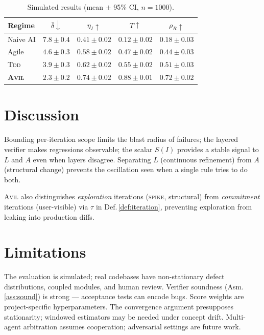\documentclass[10pt,twocolumn,letterpaper]{article}
\theoremstyle{definition}
\theoremstyle{plain}
\newcommand{\AVIL}{\textsc{Avil}}
\newcommand{\TDD}{\textsc{Tdd}}
\begin{document}
\begin{table}[t]
\centering
\caption{Simulated results (mean $\pm$ 95\% CI, $n{=}1000$).}
\label{tab:sim}
\setlength{\tabcolsep}{4pt}
\renewcommand{\arraystretch}{1.1}
\small
\begin{tabular}{@{}lcccc@{}}
\toprule
\textbf{Regime} & $\bar\delta\!\downarrow$ & $\eta_I\!\uparrow$
                & $T\!\uparrow$ & $\rho_R\!\uparrow$ \\
\midrule
Naive AI   & $7.8\pm0.4$ & $0.41\pm0.02$ & $0.12\pm0.02$ & $0.18\pm0.03$ \\
Agile      & $4.6\pm0.3$ & $0.58\pm0.02$ & $0.47\pm0.02$ & $0.44\pm0.03$ \\
\TDD{}     & $3.9\pm0.3$ & $0.62\pm0.02$ & $0.55\pm0.02$ & $0.51\pm0.03$ \\
\rowcolor{arxlight}
\textbf{\AVIL{}} & $\mathbf{2.3\pm0.2}$ & $\mathbf{0.74\pm0.02}$
  & $\mathbf{0.88\pm0.01}$ & $\mathbf{0.72\pm0.02}$ \\
\bottomrule
\end{tabular}
\end{table}

\section{Discussion}\label{sec:discussion}

Bounding per-iteration scope limits the blast radius of failures;
the layered verifier makes regressions observable; the scalar $S(I)$
provides a stable signal to $L$ and $A$ even when layers disagree.
Separating $L$ (continuous refinement) from $A$ (structural change)
prevents the oscillation seen when a single rule tries to do both.

\AVIL{} also distinguishes \emph{exploration} iterations
(\textsc{spike}, structural) from \emph{commitment} iterations
(user-visible) via $\tau$ in Def.\,\ref{def:iteration}, preventing
exploration from leaking into production diffs.

\section{Limitations}\label{sec:limitations}

The evaluation is simulated; real codebases have non-stationary
defect distributions, coupled modules, and human review. Verifier
soundness (Asm.\,\ref{ass:sound}) is strong — acceptance tests can
encode bugs. Score weights are project-specific hyperparameters. The
convergence argument presupposes stationarity; windowed estimators
may be needed under concept drift. Multi-agent arbitration assumes
cooperation; adversarial settings are future work.
\end{document}
